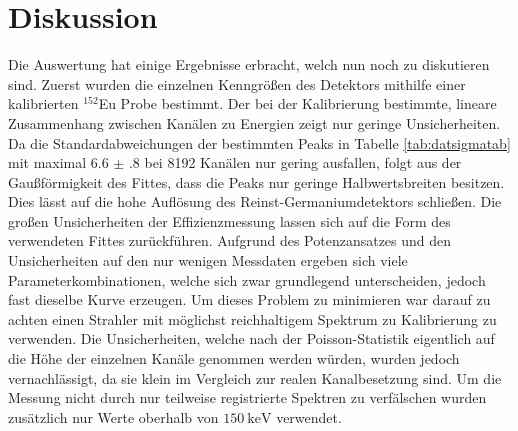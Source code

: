 
\section{Diskussion}
\label{sec:Diskussion}
Die Auswertung hat einige Ergebnisse erbracht, welch nun noch zu diskutieren sind. Zuerst wurden die einzelnen Kenngrößen des Detektors mithilfe einer kalibrierten $^{152}$Eu Probe bestimmt. Der bei der Kalibrierung bestimmte, lineare Zusammenhang zwischen Kanälen zu Energien zeigt nur geringe Unsicherheiten. Da die Standardabweichungen der bestimmten Peaks in Tabelle \ref{tab:datsigmatab} mit maximal $\num{6.6(8)}$ bei 8192 Kanälen nur gering ausfallen, folgt aus der Gaußförmigkeit des Fittes, dass die Peaks nur geringe Halbwertsbreiten besitzen. Dies lässt auf die hohe Auflösung des Reinst-Germaniumdetektors schließen.
Die großen Unsicherheiten der Effizienzmessung lassen sich auf die Form des verwendeten Fittes zurückführen. Aufgrund des Potenzansatzes und den Unsicherheiten auf den nur wenigen Messdaten ergeben sich viele Parameterkombinationen, welche sich zwar grundlegend unterscheiden, jedoch fast dieselbe Kurve erzeugen. Um dieses Problem zu minimieren war darauf zu achten einen Strahler mit möglichst reichhaltigem Spektrum zu Kalibrierung zu verwenden. Die Unsicherheiten, welche nach der Poisson-Statistik eigentlich auf die Höhe der einzelnen Kanäle genommen werden würden, wurden jedoch vernachlässigt, da sie klein im Vergleich zur realen Kanalbesetzung sind. Um die Messung nicht durch nur teilweise registrierte Spektren zu verfälschen wurden zusätzlich nur Werte oberhalb von $\SI{150}{\kilo\electronvolt}$ verwendet.

